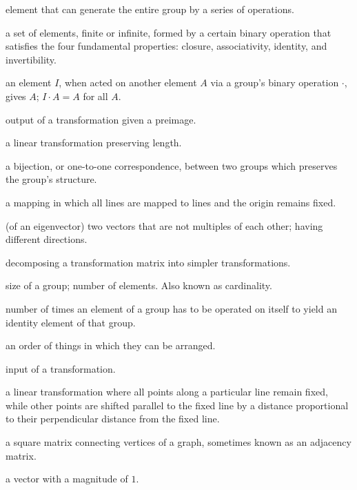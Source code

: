 \documentclass[../gatm.tex]{subfiles}
\begin{document}
\begin{description}[align=left]
\item[generator] element that can generate the entire group by a series of operations.

\item[group] a set of elements, finite or infinite, formed by a certain binary operation that satisfies the four fundamental properties: closure, associativity, identity, and invertibility.

\item[identity element] an element $I$, when acted on another element $A$ via a group's binary operation $\cdot$, gives $A$; $I\cdot A = A$ for all $A$.

\item[image] output of a transformation given a preimage.

\item[isometry] a linear transformation preserving length.

\item[isomorphism] a bijection, or one-to-one correspondence, between two groups which preserves the group's structure.

\item[linear mapping] a mapping in which all lines are mapped to lines and the origin remains fixed.

\item[linearly independent] (of an eigenvector) two vectors that are not multiples of each other; having different directions.

\item[matrix decomposition] decomposing a transformation matrix into simpler transformations.

\item[order] size of a group; number of elements. Also known as cardinality.

\item[period] number of times an element of a group has to be operated on itself to yield an identity element of that group.

\item[permutation] an order of things in which they can be arranged.

\item[preimage] input of a transformation.

\item[shear] a linear transformation where all points along a particular line remain fixed, while other points are shifted parallel to the fixed line by a distance proportional to their perpendicular distance from the fixed line.

\item[transportation matrix] a square matrix connecting vertices of a graph, sometimes known as an adjacency matrix.

\item[unit vector] a vector with a magnitude of $1$.

\end{description}
\end{document}
